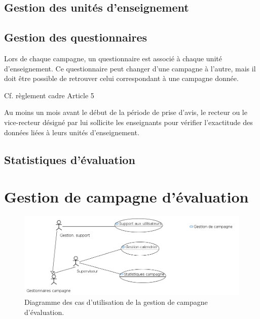 \documentclass[a4paper,11pt]{report}
\begin{document}
\subsection{Gestion des unités d'enseignement}





\subsection{Gestion des questionnaires}
Lors de chaque campagne, un questionnaire est associé à chaque unité d'enseignement.
Ce questionnaire peut changer d'une campagne à l'autre, mais il doit être possible de retrouver celui correspondant à une campagne donnée.

Cf. règlement cadre Article 5

Au moins un mois avant le début de la période de prise d'avis, le recteur ou le vice-recteur désigné par lui sollicite les enseignants pour vérifier l'exactitude des données liées à leurs unités d'enseignement.






\subsection{Statistiques d'évaluation}


















\newpage
\section{Gestion de campagne d'évaluation}

\begin{figure}[ht]
\includegraphics[width=\linewidth]{workspace/evalens-usecases/gestion_campagne.png}
\caption{Diagramme des cas d'utilisation de la gestion de campagne d'évaluation.}
\label{fig:usecase-campagne}
\end{figure}
\end{document}

